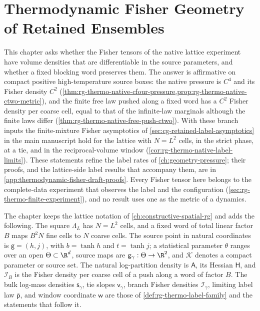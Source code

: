 \chapter{Thermodynamic Fisher Geometry of Retained Ensembles}
\label{ch:thermodynamic-fisher-draft}

This chapter asks whether the Fisher tensors of the native lattice experiment
have volume densities that are differentiable in the source parameters, and
whether a fixed blocking word preserves them. The answer is affirmative on
compact positive high-temperature source boxes: the native pressure is $C^4$
and its Fisher density $C^2$ (\cref{thm:rg-thermo-native-cfour-pressure,prop:rg-thermo-native-ctwo-metric}),
and the finite free law pushed along a fixed word has a $C^2$ Fisher density
per coarse cell, equal to that of the infinite-law marginals although the
finite laws differ (\cref{thm:rg-thermo-native-free-push-ctwo}). With these
branch inputs the finite-mixture Fisher asymptotics of
\cref{sec:cg-retained-label-asymptotics} in the main manuscript hold for the
lattice with $N=L^2$ cells, in the strict phase, at a tie, and in the
reciprocal-volume window (\cref{cor:rg-thermo-native-label-limits}). These
statements refine the label rates of \cref{ch:geometry-pressure}; their
proofs, and the lattice-side label results that accompany them, are in
\cref{app:thermodynamic-fisher-draft-proofs}. Every Fisher tensor here
belongs to the complete-data experiment that observes the label and the
configuration (\cref{sec:rg-thermo-finite-experiment}), and no result uses
one as the metric of a dynamics.

The chapter keeps the lattice notation of \cref{ch:constructive-spatial-rg}
and adds the following. The square $\Lambda_L$ has $N=L^2$ cells, and a fixed
word of total linear factor $B$ maps $B^2N$ fine cells to $N$ coarse cells.
The source point in natural coordinates is $\mathsf g=(h,j)$, with
$b=\tanh h$ and $t=\tanh j$; a statistical parameter $\theta$ ranges over an
open $\Theta\subset\R^d$, source maps are $\mathsf g_\gamma:\Theta\to\R^2$, and
$\mathcal K$ denotes a compact parameter or source set. The natural
log-partition density is $\mathsf A$, its Hessian $\mathsf H$, and
$\mathcal I_B$ is the Fisher density per coarse cell of a push along a word
of factor $B$. The bulk log-mass densities $\mathsf s_\gamma$, tie slopes
$\mathsf v_\gamma$, branch Fisher densities $\mathcal I_\gamma$, limiting label
law $\bar{\mathsf p}$, and window coordinate $\mathsf w$ are those of
\cref{def:rg-thermo-label-family} and the statements that follow it.

